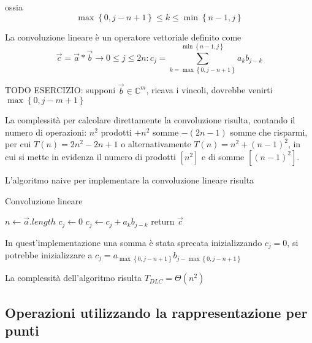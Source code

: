 ossia
\begin{equation*}
    \max\left\{ 0, j-n+1 \right\} \leq k \leq \min \left\{ n-1, j \right\}
\end{equation*}
\begin{definition}
    La convoluzione lineare è un operatore vettoriale definito come
    \begin{equation*}
        \vec{c}=\vec{a} * \vec{b} \rightarrow 0\leq j \leq 2n : c_j = \sum_{k = \max\left\{ 0, j-n+1 \right\}}^{\min \left\{ n-1, j \right\}} a_k b_{j-k}
    \end{equation*}
    \label{def:convlin}
\end{definition}
TODO ESERCIZIO: supponi $\vec{b} \in \mathbb{C}^m$, ricava i vincoli, dovrebbe venirti $\max \left\{ 0, j-m+1 \right\}$

La complessità per calcolare direttamente la convoluzione risulta, contando il numero di operazioni: $n^2$ prodotti $+n^2$ somme $-(2n-1)$ somme che risparmi, per cui $T(n)=2n^2-2n+1$ o alternativamente $T(n)=n^2+(n-1)^2$, in cui si mette in evidenza il numero di prodotti $\left[ n^2 \right]$ e di somme $\left[ (n-1)^2 \right]$.

L'algoritmo naive per implementare la convoluzione lineare risulta
\begin{algorithm}[H]
\caption{Convoluzione lineare}\label{alg:convlinnaive}
\begin{algorithmic}[1]
        \State $n \gets \vec{a}.length$
            \State $c_j \gets 0$
                \State $c_j \gets c_j + a_k b_{j-k}$
            \EndFor
        \EndFor
        \State return $ \vec{c}$
    \EndProcedure
\end{algorithmic}
\end{algorithm}
In quest'implementazione una somma è stata sprecata inizializzando $c_j=0$, si potrebbe inizializzare a $c_j=a_{\max\left\{ 0, j-n+1 \right\}}b_{j-\max\left\{ 0, j-n+1 \right\}}$

La complessità dell'algoritmo risulta $T_{DLC} = \Theta \left( n^2 \right)$
\subsection{Operazioni utilizzando la rappresentazione per punti}

